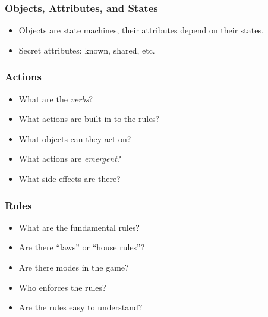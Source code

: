 \documentclass{beamer}
\begin{document}
\begin{frame}
  \frametitle{Objects, Attributes, and States}


\begin{itemize}
\item Objects are state machines, their attributes depend on their states.
\item Secret attributes:  known, shared, etc.
\end{itemize}

\end{frame}

\begin{frame}
  \frametitle{Actions}

\begin{itemize}
\item What are the {\em verbs}?
\item What actions are built in to the rules?
\item What objects can they act on?
\item What actions are {\em emergent}?
\item What side effects are there?
\end{itemize}

\end{frame}

\begin{frame}
  \frametitle{Rules}

\begin{itemize}
\item What are the fundamental rules?
\item Are there ``laws'' or ``house rules''?
\item Are there modes in the game?
\item Who enforces the rules?
\item Are the rules easy to understand?

\end{itemize}

\end{frame}
\end{document}

